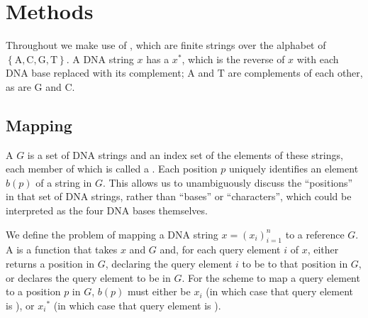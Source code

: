 

\section{Methods}






Throughout we make use of , which are finite strings over the alphabet of  $\left\{\mathrm{A}, \mathrm{C}, \mathrm{G}, \mathrm{T}\right\}$. 
A DNA string $x$ has a  $x^*$, which is the reverse of $x$ with each DNA base replaced with its complement; $\mathrm{A}$ and $\mathrm{T}$ are complements of each other, as are $\mathrm{G}$ and $\mathrm{C}$. 

\subsection{Mapping}
A  $G$ is a set of DNA strings and an index set of the elements of these strings, each member of which is called a . Each position $p$ uniquely identifies an element $b(p)$ of a string in $G$. This allows us to unambiguously discuss the ``positions'' in that set of DNA strings, rather than ``bases'' or ``characters'', which could be interpreted as the four DNA bases themselves.

 We define the problem of mapping a  DNA string $x=(x_i)_{i=1}^n$ to a reference $G$. 
A  is a function that takes $x$ and $G$ and, for each query element $i$ of $x$, either returns a position in $G$, declaring the query element $i$ to be  to that position in $G$, or declares the query element to be  in $G$. For the scheme to map a query element to a position $p$ in $G$, $b(p)$ must either be $x_i$ (in which case that query element is ), or ${x_i}^*$ (in which case that query element is ). 

